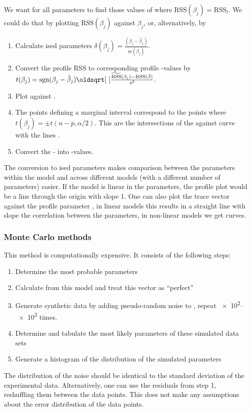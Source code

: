\begin{refsection}
We want for all parameters to find those values of  where \( \mathrm{RSS}(\beta_j) = \mathrm{RSS}_t \). We could do that by plotting \( \mathrm{RSS}(\beta_j) \) against \( \beta_j \), or, alternatively, by
\begin{enumerate}
  \item{Calculate ised parameters \( \delta(\beta_j) = \frac{(\beta_j - \hat{\beta}_j)}{\mathrm{se}(\beta_j)} \).}
  \item{Convert the profile \acs{RSS} to corresponding profile -values by \( t(\beta_j) = \sgn(\beta_j - \hat{\beta}_j) \sqrt{\frac{\widetilde{\mathrm{RSS}}(\beta_j) - \mathrm{RSS}(\hat{\beta})}{s^2}} \).}
  \item{Plot  against .}
  \item{The points defining a  marginal interval correspond to the points where \( t(\beta_j) = \pm t(n-p, \alpha/2) \). This are the intersections of the  against  curve with the lines . }
  \item{Convert the \skalar{\delta}- into \skalar{\beta}-values. }
\end{enumerate}
The conversion to ised parameters makes comparison between the parameters within the model and across different models (with a different number of parameters) easier. If the model is linear in the parameters, the profile  plot would be a line through the origin with slope \num{1}. One can also plot the trace vector  against the profile parameter , in linear models this results in a straight line with slope the correlation  between the parameters, in non-linear models we get curves.

\subsubsection{Monte Carlo methods}

This method \parencite{Str-92, Str-10} is computationally expensive. It consists of the following steps:
\begin{enumerate}
  \item{Determine the most probable parameters }
  \item{Calculate  from this model and treat this vector as ``perfect'' }
  \item{Generate synthetic data by adding pseudo-random noise to , repeat \num{e2}--\num{e3} times.  }
  \item{Determine and tabulate the most likely parameters of these simulated data sets }
  \item{Generate a histogram of the distribution of the simulated parameters }
\end{enumerate}
The distribution of the noise should be identical to the standard deviation of the experimental data. Alternatively, one can use the residuals from step 1, reshuffling them between the data points. This does not make any assumptions about the error distribution of the data points.



\end{refsection}

